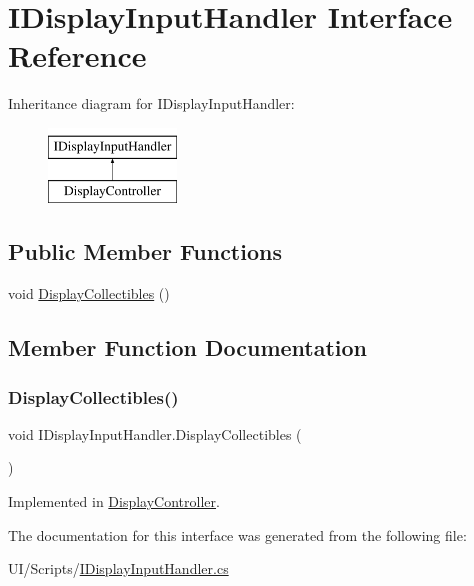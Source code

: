 \hypertarget{interface_i_display_input_handler}{}\section{I\+Display\+Input\+Handler Interface Reference}
\label{interface_i_display_input_handler}
Inheritance diagram for I\+Display\+Input\+Handler\+:\begin{figure}[H]
\begin{center}
\leavevmode
\includegraphics[height=2.000000cm]{interface_i_display_input_handler}
\end{center}
\end{figure}
\subsection*{Public Member Functions}
\begin{DoxyCompactItemize}
\item 
void \mbox{\hyperlink{interface_i_display_input_handler_a0f2bb113d10f097e671d9fa99a18bf08}{Display\+Collectibles}} ()
\end{DoxyCompactItemize}


\subsection{Member Function Documentation}
\mbox{\label{interface_i_display_input_handler_a0f2bb113d10f097e671d9fa99a18bf08}} 
\subsubsection{\texorpdfstring{Display\+Collectibles()}{DisplayCollectibles()}}
{\footnotesize\ttfamily void I\+Display\+Input\+Handler.\+Display\+Collectibles (\begin{DoxyParamCaption}{ }\end{DoxyParamCaption})}



Implemented in \mbox{\hyperlink{class_display_controller_a71f4cddb6e50da01995d87e9f21c9869}{Display\+Controller}}.



The documentation for this interface was generated from the following file\+:\begin{DoxyCompactItemize}
\item 
U\+I/\+Scripts/\mbox{\hyperlink{_i_display_input_handler_8cs}{I\+Display\+Input\+Handler.\+cs}}\end{DoxyCompactItemize}

